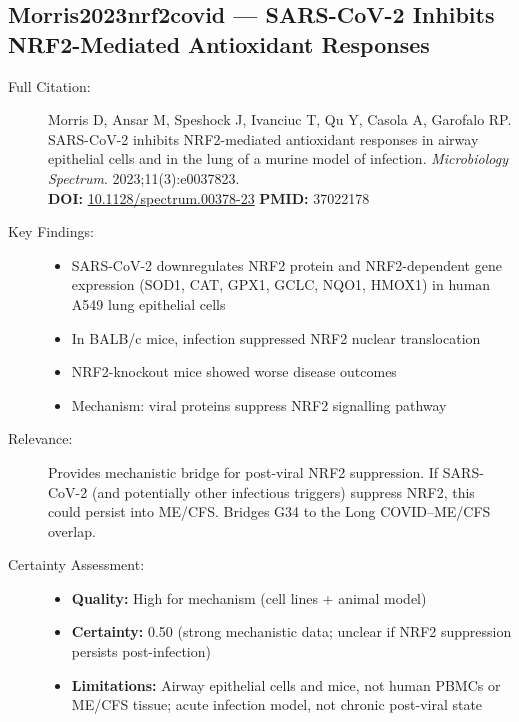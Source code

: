 \subsection*{Morris2023nrf2covid --- SARS-CoV-2 Inhibits NRF2-Mediated Antioxidant Responses}
\begin{description}
    \item[Full Citation:] Morris D, Ansar M, Speshock J, Ivanciuc T, Qu Y, Casola A, Garofalo RP. SARS-CoV-2 inhibits NRF2-mediated antioxidant responses in airway epithelial cells and in the lung of a murine model of infection. \textit{Microbiology Spectrum}. 2023;11(3):e0037823.\\
    \textbf{DOI:} \href{https://doi.org/10.1128/spectrum.00378-23}{10.1128/spectrum.00378-23} \quad \textbf{PMID:} 37022178
    \item[Key Findings:]
    \begin{itemize}
        \item SARS-CoV-2 downregulates NRF2 protein and NRF2-dependent gene expression (SOD1, CAT, GPX1, GCLC, NQO1, HMOX1) in human A549 lung epithelial cells
        \item In BALB/c mice, infection suppressed NRF2 nuclear translocation
        \item NRF2-knockout mice showed worse disease outcomes
        \item Mechanism: viral proteins suppress NRF2 signalling pathway
    \end{itemize}
    \item[Relevance:] Provides mechanistic bridge for post-viral NRF2 suppression. If SARS-CoV-2 (and potentially other infectious triggers) suppress NRF2, this could persist into ME/CFS. Bridges G34 to the Long COVID--ME/CFS overlap.
    \item[Certainty Assessment:]
    \begin{itemize}
        \item \textbf{Quality:} High for mechanism (cell lines + animal model)
        \item \textbf{Certainty:} 0.50 (strong mechanistic data; unclear if NRF2 suppression persists post-infection)
        \item \textbf{Limitations:} Airway epithelial cells and mice, not human PBMCs or ME/CFS tissue; acute infection model, not chronic post-viral state
    \end{itemize}
\end{description}


